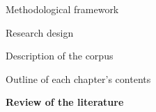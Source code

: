 \begin{listWWNumiiileveli}
\begin{listWWNumiiilevelii}
\begin{listWWNumiiileveliii}
\end{listWWNumiiileveliii}
\item 
\begin{styleNormali}
Methodological framework 
\end{styleNormali}


\setcounter{listWWNumiiileveliii}{0}
\begin{listWWNumiiileveliii}
\item 
\begin{styleNormali}
Research design
\end{styleNormali}

\item 
\begin{styleNormali}
Description of the corpus
\end{styleNormali}

\item 
\begin{styleNormali}
Outline of each chapter’s contents
\end{styleNormali}

\end{listWWNumiiileveliii}
\end{listWWNumiiilevelii}
\end{listWWNumiiileveli}
\setcounter{listWWNumiileveli}{0}
\begin{listWWNumiileveli}
\item 
\begin{styleNormali}
\textbf{Review of the literature }
\end{styleNormali}

\end{listWWNumiileveli}
\setcounter{listWWNumivleveli}{1}
